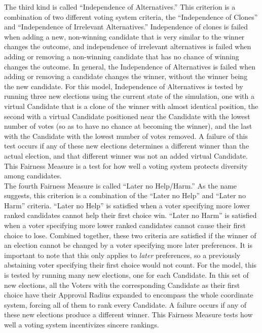 \documentclass[12pt]{article}
\begin{document}
\qquad The third kind is called ``Independence of Alternatives.'' This criterion is a combination of two different voting system criteria, the ``Independence of Clones'' and ``Independence of Irrelevant Alternatives.'' Independence of clones is failed when adding a new, non-winning candidate that is very similar to the winner changes the outcome, and independence of irrelevant alternatives is failed when adding or removing a non-winning candidate that has no chance of winning changes the outcome. In general, the Independence of Alternatives is failed when adding or removing a candidate changes the winner, without the winner being the new candidate. For this model, Independence of Alternatives is tested by running three new elections using the current state of the simulation, one with a virtual Candidate that is a clone of the winner with almost identical position, the second with a virtual Candidate positioned near the Candidate with the lowest number of votes (so as to have no chance at becoming the winner), and the last with the Candidate with the lowest number of votes removed. A failure of this test occurs if any of these new elections determines a different winner than the actual election, and that different winner was not an added virtual Candidate. This Fairness Measure is a test for how well a voting system protects diversity among candidates. \\

\qquad The fourth Fairness Measure is called ``Later no Help/Harm.'' As the name suggests, this criterion is a combination of the ``Later no Help'' and ``Later no Harm'' criteria. ``Later no Help'' is satisfied when a voter specifying more lower ranked candidates cannot help their first choice win. ``Later no Harm'' is satisfied when a voter specifying more lower ranked candidates cannot cause their first choice to lose. Combined together, these two criteria are satisfied if the winner of an election cannot be changed by a voter specifying more later preferences. It is important to note that this only applies to \textit{later} preferences, so a previously abstaining voter specifying their first choice would not count. For the model, this is tested by running many new elections, one for each Candidate. In this set of new elections, all the Voters with the corresponding Candidate as their first choice have their Approval Radius expanded to encompass the whole coordinate system, forcing all of them to rank every Candidate. A failure occurs if any of these new elections produce a different winner. This Fairness Measure tests how well a voting system incentivizes sincere rankings. \\ 
\end{document}
